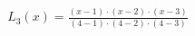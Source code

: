 \documentclass[preview]{standalone}
\begin{document}
\begin{align*}
L_3(x) = \frac{(x - 1) \cdot (x - 2) \cdot (x - 3)}{(4 - 1) \cdot (4 - 2) \cdot (4 - 3)}
\end{align*}
\end{document}
